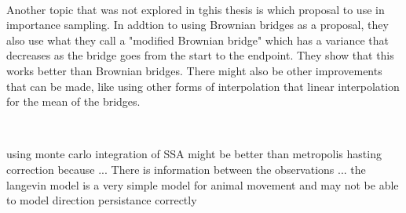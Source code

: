 \

Another topic that was not explored in tghis thesis is which proposal to use in importance sampling. In addtion to using Brownian bridges as a proposal, they also use what they call a "modified Brownian bridge" which has a variance that decreases as the bridge goes from the start to the endpoint. They show that this works better than Brownian bridges. There might also be other improvements that can be made, like using other forms of interpolation that linear interpolation for the mean of the bridges. 

\

using monte carlo integration of SSA might be better than metropolis hasting correction because ... There is information between the observations ... 
the langevin model is a very simple model for animal movement and may not be able to model direction persistance correctly
